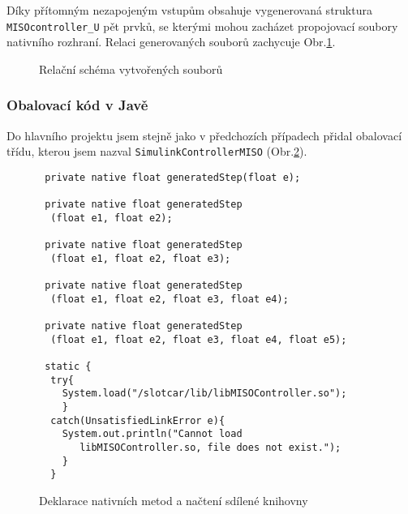 \documentclass[thesis=M,czech,hidelinks]{FITthesis}[2012/06/26]
\begin{document}
Díky přítomným nezapojeným vstupům obsahuje vygenerovaná struktura \texttt{MISOcontroller\_U} pět prvků, se kterými mohou zacházet propojovací soubory nativního rozhraní. Relaci generovaných souborů zachycuje Obr.\ref{fig:misogen}.
 \begin{figure}[h]
         \centering
         \caption{Relační schéma vytvořených souborů}
         \label{fig:misogen}
 \end{figure}
 
\subsubsection*{Obalovací kód v Javě}
Do hlavního projektu jsem stejně jako v předchozích případech přidal obalovací třídu, kterou jsem nazval \texttt{SimulinkControllerMISO} (Obr.\ref{fig:MISO.java}). 
\begin{figure}[h]               
  \begin{verbatim}
 private native float generatedStep(float e);
    
 private native float generatedStep
  (float e1, float e2);
       
 private native float generatedStep
  (float e1, float e2, float e3);
       
 private native float generatedStep
  (float e1, float e2, float e3, float e4);
       
 private native float generatedStep
  (float e1, float e2, float e3, float e4, float e5);
  
 static {
  try{
    System.load("/slotcar/lib/libMISOController.so");
    }
  catch(UnsatisfiedLinkError e){
    System.out.println("Cannot load 
       libMISOController.so, file does not exist.");
    }
  } 
  \end{verbatim}      
  \caption{Deklarace nativních metod a načtení sdílené knihovny}
  \label{fig:MISO.java}
\end{figure}
\end{document}
